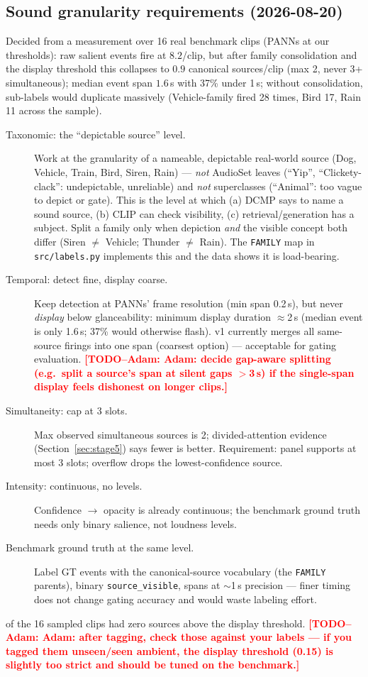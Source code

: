 \documentclass[11pt,a4paper]{article}
\newcommand{\TODO}[1]{\textcolor{red}{\textbf{[TODO--Adam: #1]}}}
\begin{document}
\subsection{Sound granularity requirements (2026-08-20)}\label{sec:granularity}
Decided from a measurement over 16 real benchmark clips (PANNs at our thresholds):
raw salient events fire at $8.2$/clip, but after family consolidation and the display threshold this
collapses to $\mathbf{0.9}$ canonical sources/clip (max 2, never 3+ simultaneous); median event span
$1.6$\,s with 37\% under 1\,s; without consolidation, sub-labels would duplicate massively
(Vehicle-family fired 28 times, Bird 17, Rain 11 across the sample).

\begin{description}
  \item[Taxonomic: the ``depictable source'' level.] Work at the granularity of a nameable,
    depictable real-world source (Dog, Vehicle, Train, Bird, Siren, Rain) --- \emph{not} AudioSet
    leaves (``Yip'', ``Clickety-clack'': undepictable, unreliable) and \emph{not} superclasses
    (``Animal'': too vague to depict or gate). This is the level at which (a) DCMP says to name a
    sound source, (b) CLIP can check visibility, (c) retrieval/generation has a subject. Split a
    family only when depiction \emph{and} the visible concept both differ (Siren $\ne$ Vehicle;
    Thunder $\ne$ Rain). The \texttt{FAMILY} map in \texttt{src/labels.py} implements this and the
    data shows it is load-bearing.
  \item[Temporal: detect fine, display coarse.] Keep detection at PANNs' frame resolution
    (min span 0.2\,s), but never \emph{display} below glanceability: minimum display duration
    $\approx$2\,s (median event is only 1.6\,s; 37\% would otherwise flash). v1 currently merges all
    same-source firings into one span (coarsest option) --- acceptable for gating evaluation.
    \TODO{Adam: decide gap-aware splitting (e.g.\ split a source's span at silent gaps $>$3\,s) if
    the single-span display feels dishonest on longer clips.}
  \item[Simultaneity: cap at 3 slots.] Max observed simultaneous sources is 2; divided-attention
    evidence (Section~\ref{sec:stage5}) says fewer is better. Requirement: panel supports at most 3
    slots; overflow drops the lowest-confidence source.
  \item[Intensity: continuous, no levels.] Confidence $\to$ opacity is already continuous; the
    benchmark ground truth needs only binary salience, not loudness levels.
  \item[Benchmark ground truth at the same level.] Label GT events with the canonical-source
    vocabulary (the \texttt{FAMILY} parents), binary \texttt{source\_visible}, spans at $\sim$1\,s
    precision --- finer timing does not change gating accuracy and would waste labeling effort.
\end{description}
 of the 16 sampled clips had zero sources above the display threshold. \TODO{Adam: after
tagging, check those against your labels --- if you tagged them unseen/seen ambient, the display
threshold (0.15) is slightly too strict and should be tuned on the benchmark.}
\end{document}
